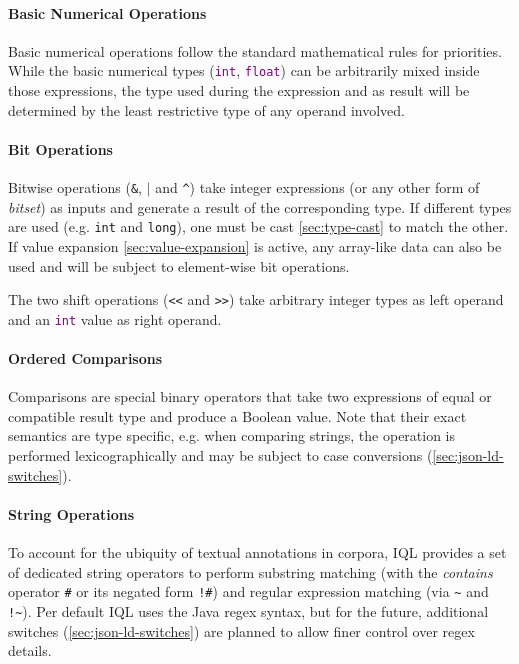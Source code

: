 \documentclass[11pt]{article}
\newcommand{\iql}{IQL\xspace}
\newcommand{\keyword}[1]{\textcolor{purple}{\texttt{#1}}}
\begin{document}
\paragraph{Basic Numerical Operations}
\label{sec:basic-numerical-operations}

Basic numerical operations follow the standard mathematical rules for priorities.
While the basic numerical types (\keyword{int}, \keyword{float}) can be arbitrarily mixed inside those expressions, the type used during the expression and as result will be determined by the least restrictive type of any operand involved.

\paragraph{Bit Operations}
\label{sec:bit-operations}

Bitwise operations (\texttt{\&}, \texttt{$|$} and \texttt{\textasciicircum}) take integer expressions (or any other form of \textit{bitset}) as inputs and generate a result of the corresponding type. If different types are used (e.g. \texttt{int} and \texttt{long}), one must be cast \ref{sec:type-cast} to match the other. If value expansion \ref{sec:value-expansion} is active, any array-like data can also be used and will be subject to element-wise bit operations.

The two shift operations (\texttt{\textless{}\textless} and \texttt{\textgreater{}\textgreater}) take arbitrary integer types as left operand and an \keyword{int} value as right operand.

\paragraph{Ordered Comparisons}
\label{sec:ordered-comparisons}

Comparisons are special binary operators that take two expressions of equal or compatible result type and produce a Boolean value. Note that their exact semantics are type specific, e.g. when comparing strings, the operation is performed lexicographically and may be subject to case conversions (\ref{sec:json-ld-switches}).

\paragraph{String Operations}
\label{sec:string-operations}

To account for the ubiquity of textual annotations in corpora, \iql provides a set of dedicated string operators to perform substring matching (with the \textit{contains} operator \texttt{\#} or its negated form \texttt{!\#}) and regular expression matching (via \texttt{\textasciitilde} and \texttt{!\textasciitilde}). Per default \iql uses the Java regex syntax, but for the future, additional switches (\ref{sec:json-ld-switches}) are planned to allow finer control over regex details.
\end{document}
